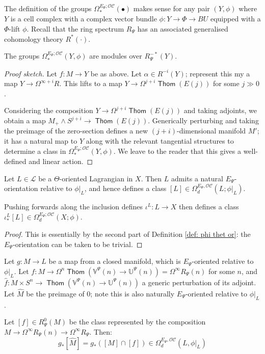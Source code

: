 \documentclass{TPmod}
\def\bU{\mathbb{U}}
\def\bV{\mathbb{V}}
\DeclareMathOperator{\Thom}{\mathsf{Thom}}
\newcommand{\cC}{\mathcal{C}}
\newcommand{\cL}{\mathcal{L}}
\newcommand{\cO}{\mathcal{O}}
\numberwithin{equation}{section}
\begin{document}
The definition of the groups $\Omega_*^{E_{\Psi};\cO\cC}(\bullet)$ makes sense for any pair $(Y,\phi)$ where $Y$ is a cell complex with a complex vector bundle $\phi: Y \to \Phi \to BU$ equipped with a  $\Phi$-lift $\phi$. Recall that 
the ring spectrum $R_{\Psi}$ has an associated generalised cohomology theory $R^*(\cdot)$.
    \begin{lem} \label{lem:module structure for OC bordism}
        The groups $\Omega_*^{E_{\Psi};\cO\cC}(Y,\phi)$ are modules over $R_{\Psi}^{-*}(Y)$.
    \end{lem}
         \begin{proof}[Proof sketch]
        Let $f: M \to Y$ be as above. Let $\alpha \in R^{-i}(Y)$; represent this my a map $Y \to \Omega^{\infty+i}R$. This lifts to a map $Y \to \Omega^{j+i}\Thom(E(j))$ for some $j \gg 0$.

        Considering the composition $Y \to \Omega^{j+i}\Thom(E(j))$ and taking adjoints, we obtain a map $M_+ \wedge S^{j+i} \to \Thom(E(j))$. Generically perturbing and taking the preimage of the zero-section defines a new $(j+i)$-dimensional manifold $M'$; it has a natural map to $Y$ along with the relevant tangential structures to determine a class in $\Omega^{E_\Psi; \cO\cC}_*(Y,\phi)$. We leave to the reader that this gives a well-defined and  linear action.
    \end{proof}
    
    
    \begin{lem}\label{lem: def oc or}
        Let $L \in \cL$ be a $\Theta$-oriented Lagrangian in $X$. Then $L$ admits a natural $E_\Psi$-orientation relative to $\phi|_L$, and hence defines a class $[L] \in \Omega^{E_\Psi,\cO\cC}_d(L; \phi|_L)$.
    \end{lem}
    Pushing forwards along the inclusion defines $\iota^L: L \to X$ then defines a class $\iota^L_*[L] \in \Omega^{E_\Psi; \cO\cC}_d(X; \phi)$.
    \begin{proof}
        This is essentially by the second part of Definition \ref{def: phi thet or}: the $E_\Psi$-orientation can be taken to be trivial. 
    \end{proof}

    \begin{lem}\label{lem: tw cap}
        Let $g: M \to L$ be a map from a closed manifold, which is $E_\Psi$-oriented relative to $\phi|_L$. Let $f: M \to \Omega^n\Thom(\bV^\Psi(n) \to \bU^\Psi(n)) = \Omega^\infty R_\Psi(n)$ for some $n$, and $\hat f: M \times S^n \to \Thom(\bV^\Psi(n) \to \bU^\Psi(n))$ a generic perturbation of its adjoint. Let $\hat M$ be the preimage of 0; note this is also naturally $E_\Psi$-oriented relative to $\phi|_L$. 
        
        Let $[f] \in R_\Psi^0(M)$ be the class represented by the composition $M \to \Omega^\infty R_\Psi(n) \to \Omega^\infty R_\Psi$. Then:
        \begin{equation}
            g_*[\hat M] = g_*\left([M] \cap [f]\right) \in \Omega^{E_\Psi,\cO\cC}_d(L, \phi|_L)
        \end{equation}
    \end{lem}
    
\end{document}
